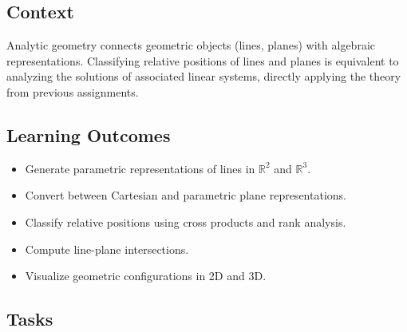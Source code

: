 \documentclass[a4paper,11pt]{article}
\begin{document}
\subsection{Context}

Analytic geometry connects geometric objects (lines, planes) with algebraic representations. Classifying relative positions of lines and planes is equivalent to analyzing the solutions of associated linear systems, directly applying the theory from previous assignments.

\subsection{Learning Outcomes}

\begin{itemize}[leftmargin=*]
  \item Generate parametric representations of lines in $\mathbb{R}^2$ and $\mathbb{R}^3$.
  \item Convert between Cartesian and parametric plane representations.
  \item Classify relative positions using cross products and rank analysis.
  \item Compute line-plane intersections.
  \item Visualize geometric configurations in 2D and 3D.
\end{itemize}

\subsection{Tasks}
\end{document}
